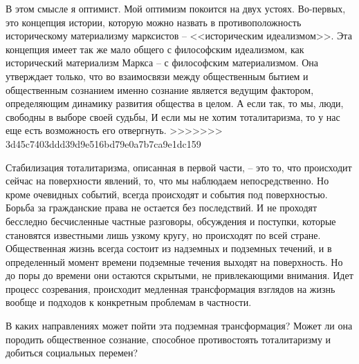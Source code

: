 \documentclass{book}
\begin{document}
В этом смысле я оптимист. Мой оптимизм покоится на двух устоях. Во-первых, это концепция истории, которую можно назвать в противоположность историческому материализму марксистов -- <<историческим идеализмом>>. Эта концепция имеет так же мало общего с философским идеализмом, как исторический материализм Маркса -- с философским матери­ализмом. Она утверждает только, что во взаимосвязи между общественным бытием и общественным сознанием именно со­знание является ведущим фактором, определяющим динамику развития общества в целом. А если так, то мы, люди, свободны в выборе своей судьбы, И если мы не хотим тоталитаризма, то у нас еще есть возможность его отвергнуть.
>>>>>>> 3d45c7403ddd39d9e516bd79e0a7b7ca9e1dc159

Стабилизация тоталитаризма, описанная в первой части, -- это то, что происходит сейчас на поверхности явлений, то, что мы наблюдаем непосредственно. Но кроме очевидных событий, всегда происходят и события под поверхностью. Борьба за гражданские права не остается без последствий. И не проходят бесследно бесчисленные частные разговоры, обсуждения и по­ступки, которые становятся известными лишь узкому кругу, но происходят по всей стране. Общественная жизнь всегда со­стоит из надземных и подземных течений, и в определенный момент времени подземные течения выходят на поверхность. Но до поры до времени они остаются скрытыми, не привлекаю­щими внимания. Идет процесс созревания, происходит медлен­ная трансформация взглядов на жизнь вообще и подходов к конкретным проблемам в частности.

В каких направлениях может пойти эта подземная трансфор­мация? Может ли она породить общественное сознание, способ­ное противостоять тоталитаризму и добиться социальных пере­мен?
\end{document}

